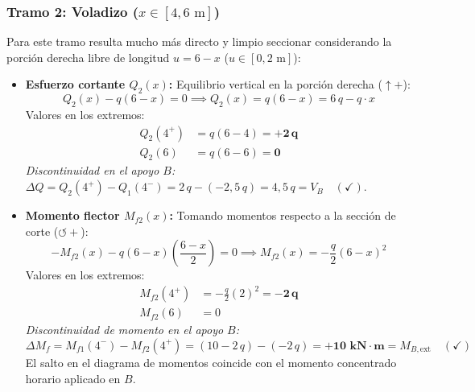 \subsubsection*{Tramo 2: Voladizo ($x \in [4, 6\text{ m}]$)}
Para este tramo resulta mucho más directo y limpio seccionar considerando la porción derecha libre de longitud $u = 6 - x$ ($u \in [0, 2\text{ m}]$):
\begin{itemize}
    \item \textbf{Esfuerzo cortante $Q_2(x)$:}
          Equilibrio vertical en la porción derecha ($\uparrow +$):
          \begin{equation}
              Q_2(x) - q(6 - x) = 0 \implies \boxed{Q_2(x) = q(6 - x) = 6\,q - q \cdot x}
          \end{equation}
          Valores en los extremos:
          \begin{align}
              Q_2(4^+) & = q(6 - 4) = \mathbf{+2\,q} \\[4pt]
              Q_2(6)   & = q(6 - 6) = \mathbf{0}
          \end{align}
          \textit{Discontinuidad en el apoyo $B$:} $\Delta Q = Q_2(4^+) - Q_1(4^-) = 2\,q - (-2{,}5\,q) = 4{,}5\,q = V_B \quad (\checkmark)$.
    \item \textbf{Momento flector $M_{f2}(x)$:}
          Tomando momentos respecto a la sección de corte ($\circlearrowleft +$):
          \begin{equation}
              -M_{f2}(x) - q(6 - x)\left(\frac{6 - x}{2}\right) = 0 \implies \boxed{M_{f2}(x) = -\frac{q}{2}(6 - x)^2}
          \end{equation}
          Valores en los extremos:
          \begin{align}
              M_{f2}(4^+) & = -\frac{q}{2}(2)^2 = \mathbf{-2\,q} \\[4pt]
              M_{f2}(6)   & = 0
          \end{align}
          \textit{Discontinuidad de momento en el apoyo $B$:}
          \[
              \Delta M_f = M_{f1}(4^-) - M_{f2}(4^+) = (10 - 2\,q) - (-2\,q) = \mathbf{+10\text{ kN}\cdot\text{m}} = M_{B,\text{ext}} \quad (\checkmark)
          \]
          El salto en el diagrama de momentos coincide con el momento concentrado horario aplicado en $B$.
\end{itemize}

